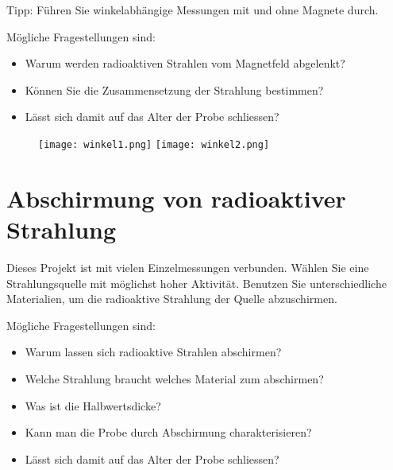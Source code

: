 \documentclass[12pt,a4paper, twosite]{article}
\begin{document}
Tipp: Führen Sie winkelabhängige Messungen mit und ohne Magnete durch.

Mögliche Fragestellungen sind:
\begin{itemize}
	\item Warum werden radioaktiven Strahlen vom Magnetfeld abgelenkt?
	\item Können Sie die Zusammensetzung der Strahlung bestimmen?
	\item Lässt sich damit auf das Alter der Probe schliessen?
\end{itemize}

\begin{figure}[t]
	\begin{center}
	\texttt{[image: winkel1.png]}
	\texttt{[image: winkel2.png]}
	\end{center}
\end{figure}
\newpage

\section*{Abschirmung von radioaktiver Strahlung}
Dieses Projekt ist mit vielen Einzelmessungen verbunden. Wählen Sie eine Strahlungsquelle mit möglichst hoher
Aktivität. Benutzen Sie unterschiedliche Materialien, um die radioaktive Strahlung der Quelle abzuschirmen. 

Mögliche Fragestellungen sind:
\begin{itemize}
	\item Warum lassen sich radioaktive Strahlen abschirmen?
	\item Welche Strahlung braucht welches Material zum abschirmen?
	\item Was ist die Halbwertsdicke?
	\item Kann man die Probe durch Abschirmung charakterisieren?
	\item Lässt sich damit auf das Alter der Probe schliessen?
\end{itemize}
\end{document}
